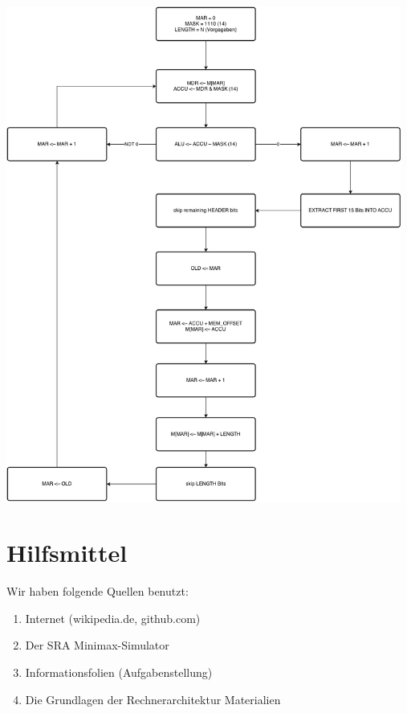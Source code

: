 \documentclass[12pt,titlepage]{article}
\begin{document}
\includegraphics[width=13cm]{algo_flow.png}

\section{Hilfsmittel}
Wir haben folgende Quellen benutzt:
\begin{enumerate} 
\item Internet (wikipedia.de, github.com)
\item Der SRA Minimax-Simulator
\item Informationsfolien (Aufgabenstellung)
\item Die Grundlagen der Rechnerarchitektur Materialien
\end{enumerate}
\end{document}

